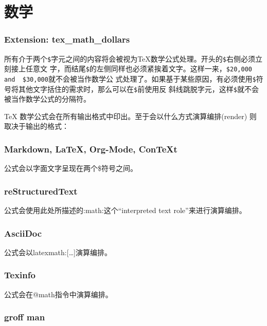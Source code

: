 \documentclass[fancyhdr,bookmark]{ctexbook}
\begin{document}
\section{数学}\label{ux6570ux5b66}

\subsubsection{Extension:
tex\_math\_dollars}\label{extension-texux5fmathux5fdollars}

所有介于两个\lstinline!$!字元之间的内容将会被视为TeX数学公式处理。开头的\lstinline!$!右侧必须立刻接上任意文
字，而结尾\lstinline!$!的左侧同样也必须紧挨着文字。这样一来，\lstinline!$20,000  and  $30,000!就不会被当作数学公
式处理了。如果基于某些原因，有必须使用\lstinline!$!符号将其他文字括住的需求时，那么可以在\lstinline!$!前使用反
斜线跳脱字元，这样\lstinline!$!就不会被当作数学公式的分隔符。

TeX 数学公式会在所有输出格式中印出。至于会以什么方式演算编排(render)
则取决于输出的格式：

\subsubsection{Markdown, LaTeX, Org-Mode,
ConTeXt}\label{markdown-latex-org-mode-context}

公式会以字面文字呈现在两个\$符号之间。

\subsubsection{reStructuredText}\label{restructuredtext}

公式会使用此处所描述的:math:这个``interpreted text
role''来进行演算编排。

\subsubsection{AsciiDoc}\label{asciidoc}

公式会以latexmath:{[}\ldots{}{]}演算编排。

\subsubsection{Texinfo}\label{texinfo}

公式会在@math指令中演算编排。

\subsubsection{groff man}\label{groff-man}
\end{document}
